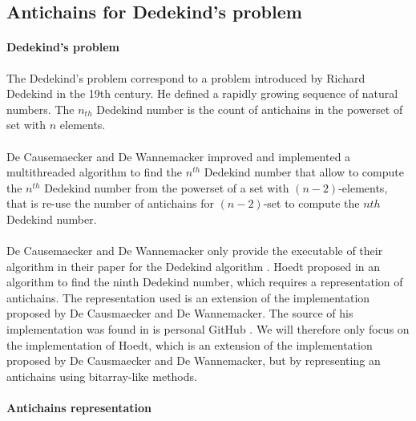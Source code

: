 \documentclass[letterpaper]{article}
\theoremstyle{definition}
\begin{document}
\subsection{Antichains for Dedekind's problem}

\label{sota_hoedts}

\paragraph{Dedekind's problem}

The Dedekind's problem correspond to a problem introduced by Richard
Dedekind in the 19th century. He defined a rapidly growing sequence
of natural numbers. The $n_{th}$ Dedekind number is the count
of antichains in the powerset of set with $n$ elements.

\paragraph{}

De Causemaecker and De Wannemacker \cite{causemaecker1} improved and
implemented a multithreaded algorithm to find the $n^{th}$ Dedekind number
that allow to compute the $n^{th}$ Dedekind number from the powerset
of a set with $(n-2)$-elements, that is re-use the number of antichains
for $(n-2)$-set to compute the $n{th}$ Dedekind number.


\paragraph{}

De Causemaecker and De Wannemacker only provide the executable of
their algorithm in their paper for
the Dedekind algorithm \cite{causemaecker1}. Hoedt proposed in \cite{hoedt}
an algorithm to find the ninth Dedekind number, which requires a representation
of antichains. The representation used is an extension of the implementation
proposed by De Causmaecker and De Wannemacker. The source of his
implementation was found in is personal GitHub \cite{hoedt_src}.
We will therefore only focus on the implementation
of Hoedt, which is an extension of the implementation proposed
by De Causmaecker and De Wannemacker, but by representing an antichains
using bitarray-like methods.

\paragraph{Antichains representation}
\end{document}
